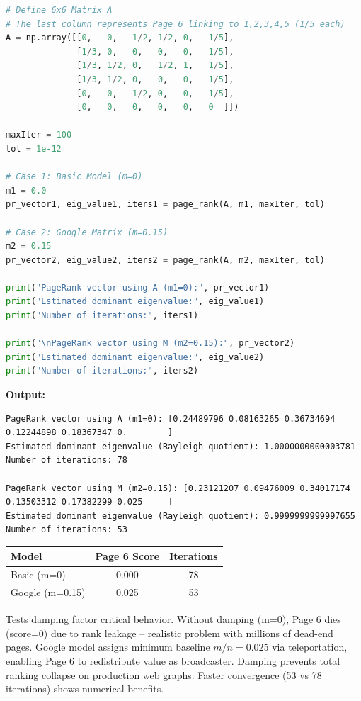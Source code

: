 \documentclass[11pt]{article}
\begin{document}
\begin{lstlisting}[language=Python]
# Define 6x6 Matrix A
# The last column represents Page 6 linking to 1,2,3,4,5 (1/5 each)
A = np.array([[0,   0,   1/2, 1/2, 0,   1/5],
              [1/3, 0,   0,   0,   0,   1/5],
              [1/3, 1/2, 0,   1/2, 1,   1/5],
              [1/3, 1/2, 0,   0,   0,   1/5],
              [0,   0,   1/2, 0,   0,   1/5],
              [0,   0,   0,   0,   0,   0  ]])

maxIter = 100
tol = 1e-12

# Case 1: Basic Model (m=0)
m1 = 0.0
pr_vector1, eig_value1, iters1 = page_rank(A, m1, maxIter, tol)

# Case 2: Google Matrix (m=0.15)
m2 = 0.15
pr_vector2, eig_value2, iters2 = page_rank(A, m2, maxIter, tol)

print("PageRank vector using A (m1=0):", pr_vector1)
print("Estimated dominant eigenvalue:", eig_value1)
print("Number of iterations:", iters1)

print("\nPageRank vector using M (m2=0.15):", pr_vector2)
print("Estimated dominant eigenvalue:", eig_value2)
print("Number of iterations:", iters2)
\end{lstlisting}

\noindent\textbf{Output:}
\begin{lstlisting}
PageRank vector using A (m1=0): [0.24489796 0.08163265 0.36734694 0.12244898 0.18367347 0.        ]
Estimated dominant eigenvalue (Rayleigh quotient): 1.0000000000003781
Number of iterations: 78

PageRank vector using M (m2=0.15): [0.23121207 0.09476009 0.34017174 0.13503312 0.17382299 0.025     ]
Estimated dominant eigenvalue (Rayleigh quotient): 0.9999999999997655
Number of iterations: 53
\end{lstlisting}




\begin{table}[H]
\centering
\begin{tabular}{|l|c|c|}
\hline
\textbf{Model} & \textbf{Page 6 Score} & \textbf{Iterations} \\
\hline
Basic (m=0) & 0.000 & 78 \\
Google (m=0.15) & 0.025 & 53 \\
\hline
\end{tabular}
\end{table}

\noindent Tests damping factor critical behavior. Without damping (m=0), Page 6 dies (score=0) due to rank leakage -- realistic problem with millions of dead-end pages. Google model assigns minimum baseline $m/n=0.025$ via teleportation, enabling Page 6 to redistribute value as broadcaster. Damping prevents total ranking collapse on production web graphs. Faster convergence (53 vs 78 iterations) shows numerical benefits.
\end{document}
